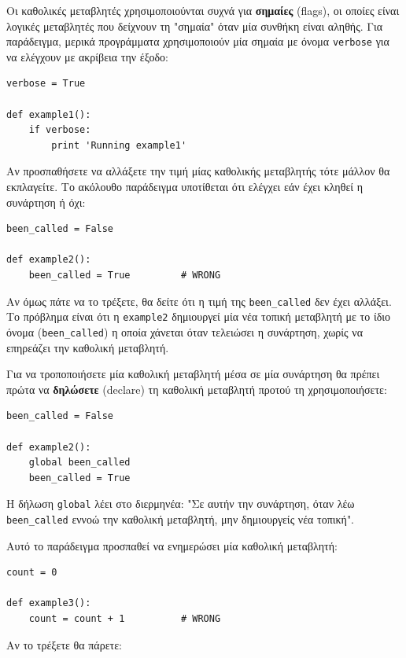 \documentclass[10pt]{book}
\begin{document}
Οι καθολικές μεταβλητές χρησιμοποιούνται συχνά για {\bf σημαίες} (flags), οι οποίες είναι λογικές μεταβλητές που δείχνουν τη "σημαία" όταν μία συνθήκη είναι αληθής. Για παράδειγμα, μερικά προγράμματα χρησιμοποιούν μία σημαία με όνομα  {\tt verbose} για να ελέγχουν με ακρίβεια την έξοδο:

\begin{verbatim}
verbose = True

def example1():
    if verbose:
        print 'Running example1'
\end{verbatim}
%
Αν προσπαθήσετε να αλλάξετε την τιμή μίας καθολικής μεταβλητής τότε μάλλον θα εκπλαγείτε. Το ακόλουθο παράδειγμα υποτίθεται ότι ελέγχει εάν έχει κληθεί η συνάρτηση ή όχι:

\begin{verbatim}
been_called = False

def example2():
    been_called = True         # WRONG
\end{verbatim}
%
Αν όμως πάτε να το τρέξετε, θα δείτε ότι η τιμή της \verb"been_called" δεν έχει αλλάξει. Το πρόβλημα είναι ότι η {\tt example2} δημιουργεί μία νέα τοπική μεταβλητή με το ίδιο όνομα (\verb"been_called") η οποία χάνεται όταν τελειώσει η συνάρτηση, χωρίς να επηρεάζει την καθολική μεταβλητή.

Για να τροποποιήσετε μία καθολική μεταβλητή μέσα σε μία συνάρτηση θα πρέπει πρώτα να {\bf δηλώσετε} (declare) τη καθολική μεταβλητή προτού τη χρησιμοποιήσετε:

\begin{verbatim}
been_called = False

def example2():
    global been_called
    been_called = True
\end{verbatim}
%
Η δήλωση {\tt global} λέει στο διερμηνέα: "Σε αυτήν την συνάρτηση, όταν λέω  \verb"been_called" εννοώ την καθολική μεταβλητή, μην δημιουργείς νέα τοπική".

Αυτό το παράδειγμα προσπαθεί να ενημερώσει μία καθολική μεταβλητή:

\begin{verbatim}
count = 0

def example3():
    count = count + 1          # WRONG
\end{verbatim}
%
Αν το τρέξετε θα πάρετε:
\end{document}
